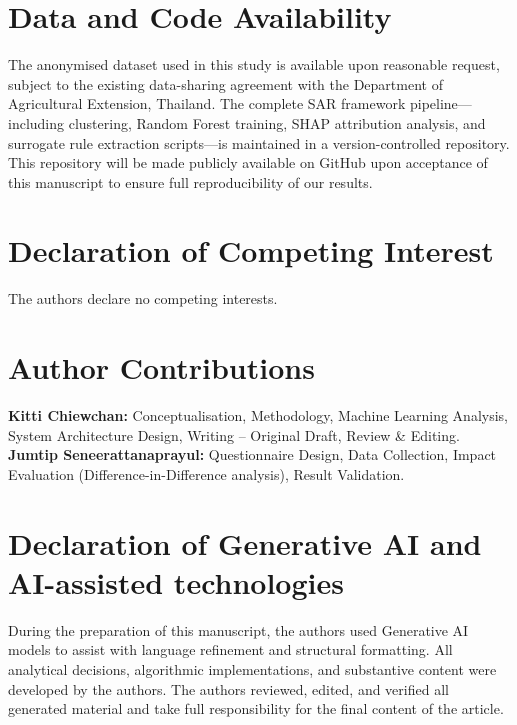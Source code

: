 \documentclass[fleqn,10pt,lineno]{wlpeerj}
\begin{document}
\section*{Data and Code Availability}
The anonymised dataset used in this study is available upon reasonable request, subject to the existing data-sharing agreement with the Department of Agricultural Extension, Thailand. The complete SAR framework pipeline—including clustering, Random Forest training, SHAP attribution analysis, and surrogate rule extraction scripts—is maintained in a version-controlled repository. This repository will be made publicly available on GitHub upon acceptance of this manuscript to ensure full reproducibility of our results.

\section*{Declaration of Competing Interest}
The authors declare no competing interests.

\section*{Author Contributions}
\textbf{Kitti Chiewchan:} Conceptualisation, Methodology, Machine Learning Analysis, System Architecture Design, Writing -- Original Draft, Review \& Editing. \\
\textbf{Jumtip Seneerattanaprayul:} Questionnaire Design, Data Collection, Impact Evaluation (Difference-in-Difference analysis), Result Validation.

\section*{Declaration of Generative AI and AI-assisted technologies}
During the preparation of this manuscript, the authors used Generative AI models to assist with language refinement and structural formatting. All analytical decisions, algorithmic implementations, and substantive content were developed by the authors. The authors reviewed, edited, and verified all generated material and take full responsibility for the final content of the article.


\end{document}
